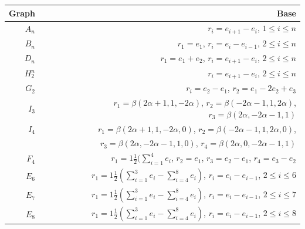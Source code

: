 \begin{center}
\begin{tabular} {|r|r|}
\hline
{\bf Graph} & {\bf Base} \\
\hline
$A_n$ & $r_i= e_{i+1}-e_i$, $1 \le i \le n$ \\
\hline
$B_n$ & $r_1= e_1$, $r_i= e_{i}-e_{i-1}$, $2 \le i \le n$ \\
\hline
$D_n$ & $r_1= e_1 + e_2$, $r_i= e_{i+1}-e_i$, $2 \le i \le n$ \\
\hline
$H_2^n$ & $r_i= e_{i+1}-e_i$, $2 \le i \le n$ \\
\hline
$G_2$ & $r_i= e_2-e_1$, $r_2 = e_1 -2e_2+e_3$ \\
\hline
$I_3$ & 
$r_1= \beta(2 \alpha + 1, 1, -2 \alpha)$,
$r_2= \beta(-2 \alpha - 1, 1, 2 \alpha)$,
$r_3= \beta(2 \alpha, -2 \alpha -1 , 1)$\\
\hline
$I_4$ & $r_1= \beta(2 \alpha + 1, 1, -2 \alpha, 0)$, $r_2= \beta(-2 \alpha - 1, 1, 2 \alpha, 0)$,\\
 & $r_3= \beta(2 \alpha, -2 \alpha -1 , 1, 0)$, $r_4= \beta(2 \alpha, 0, -2 \alpha -1 , 1)$ \\
\hline
$F_4$ & 
$r_1= 1{\frac 1 2} (\sum_{i=1}^4 e_i$, $r_2= e_1$, $r_3= e_2 - e_1$, $r_4= e_3- e_2$ \\
\hline
$E_6$ & $r_1= 1{\frac 1 2} (\sum_{i=1}^3 e_i - \sum_{i=4}^8 e_i)$, $r_i= e_i-e_{i-1}$, 
$2 \le i \le 6$ \\
\hline
$E_7$ & $r_1= 1{\frac 1 2} (\sum_{i=1}^3 e_i - \sum_{i=4}^8 e_i)$, $r_i= e_i-e_{i-1}$, 
$2 \le i \le 7$ \\
\hline
$E_8$ & $r_1= 1{\frac 1 2} (\sum_{i=1}^3 e_i - \sum_{i=4}^8 e_i)$, $r_i= e_i-e_{i-1}$, 
$2 \le i \le 8$ \\
\hline
\end{tabular}
\end{center}

